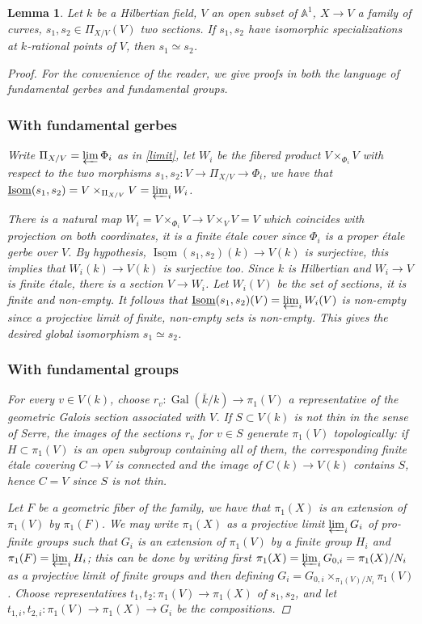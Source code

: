 \documentclass[11pt]{amsart}
\theoremstyle{plain}
\newtheorem{lemma}[theorem]{Lemma}
\theoremstyle{definition}
\newcommand{\on}{\operatorname}
\newcommand{\1}{\mathbb{1}}
\newcommand{\A}{\mathbb{A}}
\newcommand{\gal}{\on{Gal}}
\newcommand{\uisom}{\underline{\on{Isom}}}
\renewcommand{\projlim}{\varprojlim}
\begin{document}
\begin{lemma}\label{hilbsp}
	Let $k$ be a Hilbertian field, $V$ an open subset of $\A^{1}$, $X\to V$ a family of curves, $s_{1},s_{2}\in\Pi_{X/V}(V)$ two sections. If $s_{1},s_{2}$ have isomorphic specializations at $k$-rational points of $V$, then $s_{1}\simeq s_{2}$.
	\begin{proof}
		For the convenience of the reader, we give proofs in both the language of fundamental gerbes and fundamental groups.
		 
		\subsubsection*{With fundamental gerbes} Write $\Pi_{X/V}=\projlim\Phi_{i}$ as in \autoref{limit}, let $W_{i}$ be the fibered product $V\times_{\Phi_{i}}V$ with respect to the two morphisms $s_{1},s_{2}:V\to\Pi_{X/V}\to\Phi_{i}$, we have that $\uisom(s_{1},s_{2})=V\times_{\Pi_{X/V}}V=\projlim_{i}W_{i}$.
		
		There is a natural map $W_{i}=V\times_{\Phi_{i}}V\to V\times_{V}V=V$ which coincides with projection on both coordinates, it is a finite étale cover since $\Phi_{i}$ is a proper étale gerbe over $V$. By hypothesis, $\uisom(s_{1},s_{2})(k)\to V(k)$ is surjective, this implies that $W_{i}(k)\to V(k)$ is surjective too. Since $k$ is Hilbertian and $W_{i}\to V$ is finite étale, there is a section $V\to W_{i}$. Let $W_{i}(V)$ be the set of sections, it is finite and non-empty. It follows that $\uisom(s_{1},s_{2})(V)=\projlim_{i}W_{i}(V)$ is non-empty since a projective limit of finite, non-empty sets is non-empty. This gives the desired global isomorphism $s_{1}\simeq s_{2}$.
		
		\subsubsection*{With fundamental groups} For every $v\in V(k)$, choose $r_{v}:\gal(\bar{k}/k)\to\pi_{1}(V)$ a representative of the geometric Galois section associated with $V$. If $S\subset V(k)$ is not thin in the sense of Serre, the images of the sections $r_{v}$ for $v\in S$ generate $\pi_{1}(V)$ topologically: if $H\subset\pi_{1}(V)$ is an open subgroup containing all of them, the corresponding finite étale covering $C\to V$ is connected and the image of $C(k)\to V(k)$ contains $S$, hence $C=V$ since $S$ is not thin.
		
		Let $F$ be a geometric fiber of the family, we have that $\pi_{1}(X)$ is an extension of $\pi_{1}(V)$ by $\pi_{1}(F)$. We may write $\pi_{1}(X)$ as a projective limit $\projlim_{i}G_{i}$ of pro-finite groups such that $G_{i}$ is an extension of $\pi_{1}(V)$ by a finite group $H_{i}$ and $\pi_{1}(F)=\projlim_{i}H_{i}$; this can be done by writing first $\pi_{1}(X)=\projlim_{i}G_{0,i}=\pi_{1}(X)/N_{i}$ as a projective limit of finite groups and then defining $G_{i}=G_{0,i}\times_{\pi_{1}(V)/N_{i}}\pi_{1}(V)$. Choose representatives $t_{1},t_{2}:\pi_{1}(V)\to\pi_{1}(X)$ of $s_{1},s_{2}$, and let $t_{1,i},t_{2,i}:\pi_{1}(V)\to \pi_{1}(X)\to G_{i}$ be the compositions.
		

\end{proof}
\end{lemma}
\end{document}
